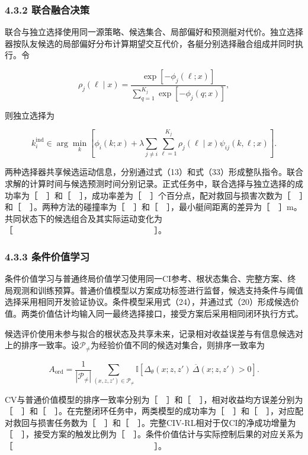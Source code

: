 \documentclass[
  11pt,
  fontset=none]{ctexart}
\begin{document}
\subsubsection{4.3.2
联合融合决策}\label{ux8054ux5408ux878dux5408ux51b3ux7b56}

联合与独立选择使用同一源策略、候选集合、局部偏好和预测艇对代价。独立选择器按队友候选的局部偏好分布计算期望交互代价，各艇分别选择融合组成并同时执行。令

\[
\rho_j(\ell\mid x)
=\frac{\exp[-\phi_j(\ell;x)]}
{\sum_{q=1}^{K_j}\exp[-\phi_j(q;x)]},
\tag{32}
\]

则独立选择为

\[
k_i^{\mathrm{ind}}\in\arg\min_k
\left[
\phi_i(k;x)+\lambda\sum_{j\ne i}
\sum_{\ell=1}^{K_j}\rho_j(\ell\mid x)\psi_{ij}(k,\ell;x)
\right] .
\tag{33}
\]

两种选择器共享候选运动信息，分别通过式（13）和式（33）形成整队指令。联合求解的计算时间与候选预测时间分别记录。正式任务中，联合选择与独立选择的成功率为［　］和［　］，成功率差为［　］个百分点，配对救回与损害次数为［　］和［　］。两种方法的碰撞率为［　］和［　］，最小艇间距离的差异为［　］m。共同状态下的候选组合及其实际运动变化为［　　　　　　　　　　　　　　　　　］。

\subsubsection{4.3.3
条件价值学习}\label{ux6761ux4ef6ux4ef7ux503cux5b66ux4e60}

条件价值学习与普通终局价值学习使用同一CI参考、根状态集合、完整方案、终局观测和训练预算。普通价值模型以方案成功标签进行监督，候选支持条件与阈值选择采用相同开发验证协议。条件模型采用式（24），并通过式（20）形成候选价值。两类价值估计均输入同一最终选择接口，接受方案后采用相同闭环执行方式。

候选评价使用未参与拟合的根状态及共享未来，记录相对收益误差与有信息候选对上的排序一致率。设\(\mathcal P_\ne\)为经验价值不同的候选对集合，则排序一致率为

\[
A_{\mathrm{ord}}
=\frac{1}{|\mathcal P_\ne|}
\sum_{(x,z,z')\in\mathcal P_\ne}
\mathbb I\!\left[
\Delta_\theta(x;z,z')\,
\overline\Delta(x;z,z')>0
\right] .
\tag{34}
\]

CV与普通价值模型的排序一致率分别为［　］和［　］，相对收益均方误差分别为［　］和［　］。在完整闭环任务中，两类模型的成功率为［　］和［　］，对应配对救回与损害任务数为［　］和［　］。完整CIV-RL相对于仅CI的净成功增量为［　］，接受方案的触发比例为［　］。条件价值估计与实际控制后果的对应关系为［　　　　　　　　　　　　　　　　　］。
\end{document}
